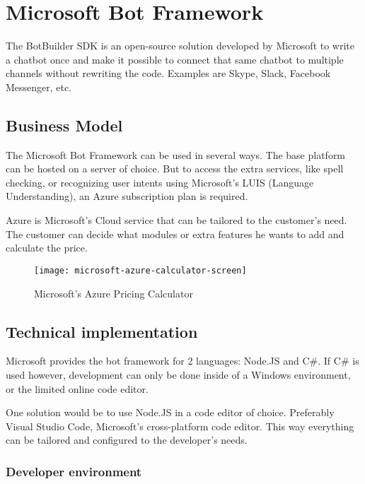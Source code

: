 \chapter{Microsoft Bot Framework}

The BotBuilder SDK is an open-source solution developed by Microsoft to write a chatbot once and make it possible to connect that same chatbot to multiple channels without rewriting the code. Examples are Skype, Slack, Facebook Messenger, etc.

\section{Business Model}

The Microsoft Bot Framework can be used in several ways. The base platform can be hosted on a server of choice. But to access the extra services, like spell checking, or recognizing user intents using Microsoft's LUIS (Language Understanding), an Azure subscription plan is required.

Azure is Microsoft's Cloud service that can be tailored to the customer's need. The customer can decide what modules or extra features he wants to add and calculate the price.

\begin{figure}[ht]
	\centering
	\texttt{[image: microsoft-azure-calculator-screen]}
	\caption{Microsoft's Azure Pricing Calculator~\cite{azure-pricing-calculator}}
	\label{fig:microsoft-azure-calculator-screen}
\end{figure}

\section{Technical implementation}

Microsoft provides the bot framework for 2 languages: Node.JS\cite{node-js} and C\#. If C\# is used however, development can only be done inside of a Windows environment, or the limited online code editor.

One solution would be to use Node.JS in a code editor of choice. Preferably Visual Studio Code\cite{visual-studio-code}, Microsoft's cross-platform code editor. This way everything can be tailored and configured to the developer's needs.

\subsection{Developer environment}

